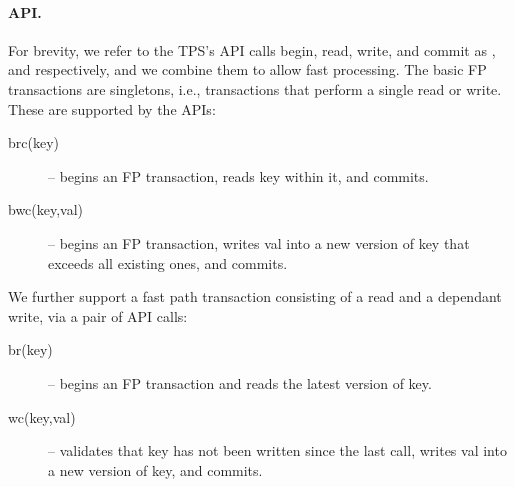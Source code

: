 \paragraph{API.}
For brevity, we refer to the TPS's API calls  begin, read, write, and commit as , and  respectively, and 
we combine them to allow fast processing.
The basic FP transactions are singletons, i.e., transactions that perform a single
read or write. These are supported by the APIs: 
\begin{description}
\item[brc(key)] -- begins an FP transaction, reads key within it, and commits.
\item[bwc(key,val)] -- begins an FP transaction,  writes val into a new version of key that exceeds all existing ones, and commits.
\end{description}

We further support a fast path transaction consisting of a read and a dependant write, via a pair of API calls:
\begin{description}
\item[br(key)] -- begins an FP transaction and  reads the latest version of key.
\item[wc(key,val)] -- 	validates that key has not been written since the last  call, writes val into a new version of key, and commits.
\end{description}

